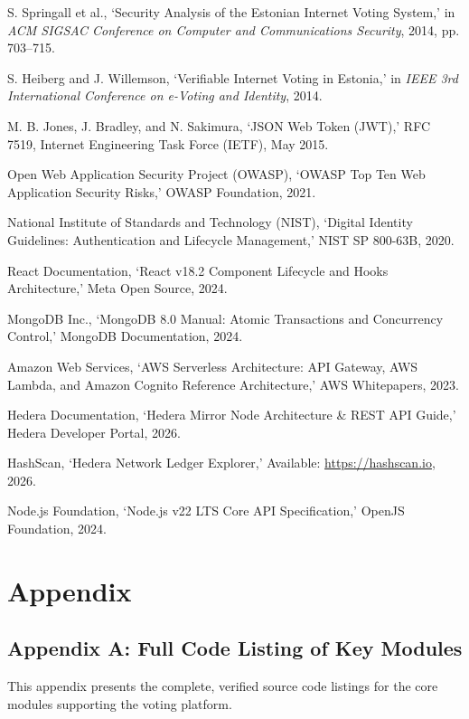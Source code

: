 \documentclass[12pt, a4paper]{article}
\begin{document}
\begin{enumerate}[label={[\arabic*]}, leftmargin=*]
    \item S. Springall et al., `Security Analysis of the Estonian Internet Voting System,' in \textit{ACM SIGSAC Conference on Computer and Communications Security}, 2014, pp. 703--715.
    \item S. Heiberg and J. Willemson, `Verifiable Internet Voting in Estonia,' in \textit{IEEE 3rd International Conference on e-Voting and Identity}, 2014.
    \item M. B. Jones, J. Bradley, and N. Sakimura, `JSON Web Token (JWT),' RFC 7519, Internet Engineering Task Force (IETF), May 2015.
    \item Open Web Application Security Project (OWASP), `OWASP Top Ten Web Application Security Risks,' OWASP Foundation, 2021.
    \item National Institute of Standards and Technology (NIST), `Digital Identity Guidelines: Authentication and Lifecycle Management,' NIST SP 800-63B, 2020.
    \item React Documentation, `React v18.2 Component Lifecycle and Hooks Architecture,' Meta Open Source, 2024.
    \item MongoDB Inc., `MongoDB 8.0 Manual: Atomic Transactions and Concurrency Control,' MongoDB Documentation, 2024.
    \item Amazon Web Services, `AWS Serverless Architecture: API Gateway, AWS Lambda, and Amazon Cognito Reference Architecture,' AWS Whitepapers, 2023.
    \item Hedera Documentation, `Hedera Mirror Node Architecture \& REST API Guide,' Hedera Developer Portal, 2026.
    \item HashScan, `Hedera Network Ledger Explorer,' Available: \url{https://hashscan.io}, 2026.
    \item Node.js Foundation, `Node.js v22 LTS Core API Specification,' OpenJS Foundation, 2024.
\end{enumerate}

\newpage
\appendix
\section{Appendix}

\subsection{Appendix A: Full Code Listing of Key Modules}
This appendix presents the complete, verified source code listings for the core modules supporting the voting platform.
\end{document}

